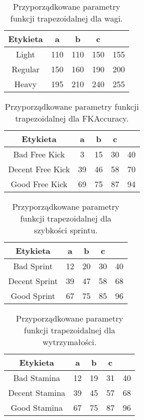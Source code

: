 \documentclass{classrep}
\begin{document}
\begin{table}[H]
	\centering
	\begin{tabular}{c c c c c} 
		\hline
		\textbf{Etykieta} & \textbf{a} & \textbf{b} & \textbf{c}  \\ [0.5ex] 
		\hline
		\hline 
		Light & 110 & 110 & 150 & 155 \\ 
		Regular & 150 & 160 & 190 & 200 \\
		Heavy & 195 & 210 & 240 & 255 \\
		\hline
	\end{tabular}
	\caption{Przyporządkowane parametry funkcji trapezoidalnej dla wagi.}
\end{table}


\begin{table}[H]
	\centering
	\begin{tabular}{c c c c c} 
		\hline
		\textbf{Etykieta} & \textbf{a} & \textbf{b} & \textbf{c}  \\ [0.5ex] 
		\hline
		\hline 
		Bad Free Kick & 3 & 15 & 30 & 40 \\ 
		Decent Free Kick & 39 & 46 & 58 & 70 \\
		Good Free Kick & 69 & 75 & 87 & 94 \\
		\hline
	\end{tabular}
	\caption{Przyporządkowane parametry funkcji trapezoidalnej dla FKAccuracy.}
\end{table}

\begin{table}[H]
	\centering
	\begin{tabular}{c c c c c} 
		\hline
		\textbf{Etykieta} & \textbf{a} & \textbf{b} & \textbf{c}  \\ [0.5ex] 
		\hline
		\hline 
		Bad Sprint & 12 & 20 & 30 & 40 \\ 
		Decent Sprint & 39 & 47 & 58 & 68 \\
		Good Sprint & 67 & 75 & 85 & 96 \\
		\hline
	\end{tabular}
	\caption{Przyporządkowane parametry funkcji trapezoidalnej dla szybkości sprintu.}
\end{table}

\begin{table}[H]
	\centering
	\begin{tabular}{c c c c c} 
		\hline
		\textbf{Etykieta} & \textbf{a} & \textbf{b} & \textbf{c}  \\ [0.5ex] 
		\hline
		\hline 
		Bad Stamina & 12 & 19 & 31 & 40 \\ 
		Decent Stamina & 39 & 45 & 57 & 68 \\
		Good Stamina & 67 & 75 & 87 & 96 \\
		\hline
	\end{tabular}
	\caption{Przyporządkowane parametry funkcji trapezoidalnej dla wytrzymałości.}
\end{table}
\end{document}
